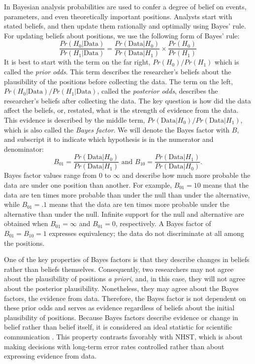 \documentclass[man]{apa6}
\begin{document}
\nocite{Laplace:1986,Morey:Rouder:2014}

In Bayesian analysis probabilities are used to confer a degree of belief on events, parameters, and even theoretically important positions.  Analysts start with stated beliefs, and then update them rationally and optimally using Bayes' rule.  For updating beliefs about positions, we use the following form of Bayes' rule:
\begin{equation}
\frac{Pr(H_0 | \mbox{Data})}{Pr(H_1 | \mbox{Data})} = \frac{Pr(\mbox{Data} | H_0)}{Pr(\mbox{Data} | H_1)} \times \frac{Pr(H_0)}{Pr (H_1)} 
\end{equation}
It is best to start with the term on the far right, $Pr(H_0)/Pr(H_1)$ which is called the {\em prior odds}.  This term describes the researcher's beliefs about the plausibility of the positions before collecting the data.  The term on the left, $Pr(H_0 | \mbox{Data})/Pr(H_1 | \mbox{Data})$, called the {\em posterior odds}, describes the researcher's beliefs after collecting the data.   The key question is how did the data affect the beliefs, or, restated, what is the strength of evidence from the data.  This evidence is described by the middle term,  $Pr(\mbox{Data} | H_0)/Pr(\mbox{Data} | H_1)$, which is also called the {\em Bayes factor}.  We will denote the Bayes factor with $B$, and subscript it to indicate which hypothesis is in the numerator and denominator:
\[
B_{01} = \frac{Pr(\mbox{Data} | H_0)}{Pr(\mbox{Data} | H_1)} \mbox{ and } B_{10} = \frac{Pr(\mbox{Data} | H_1)}{Pr(\mbox{Data} | H_0)}.
\]
Bayes factor values range from 0 to $\infty$ and describe how much more probable the data are under one position than another.  For example, $B_{01}=10$ means that the data are ten times more probable than under the null than under the alternative, while $B_{01}=.1$ means that the data are ten times more probable under the alternative than under the null.  Infinite support for the null and alternative are obtained when $B_{01}=\infty$ and $B_{01}=0$, respectively.  A Bayes factor of $B_{01}=B_{10}=1$ expresses equivalency; the data do not discriminate at all among the positions.

One of the key properties of Bayes factors is that they describe changes in beliefs rather than beliefs themselves.  Consequently, two researchers may not agree about the plausibility of positions {\em a priori}, and, in this case, they will not agree about the posterior plausibility.  Nonetheless, they may agree about the Bayes factors, the evidence from data.  Therefore, the Bayes factor is not dependent on these prior odds and serves as evidence regardless of beliefs about the initial plausibility of positions.  Because Bayes factors describe evidence or change in belief rather than belief itself, it is considered an ideal statistic for scientific communication \citep{Jeffreys:1961}.  This property contrasts favorably with NHST, which is about making decisions with long-term error rates controlled rather than about expressing evidence from data. 
\end{document}
